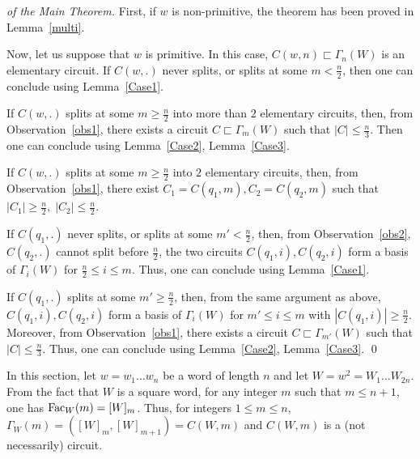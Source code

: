 \documentclass[runningheads,envcountsame,a4paper]{llncs}
\newcommand{\fac}{\hbox{\rm Fac}}
\begin{document}
\begin{proof}[of the Main Theorem]
First, if $w$ is non-primitive, the theorem has been proved in Lemma~\ref{multi}. 

Now, let us suppose that $w$ is primitive. In this case, $C(w,n) \sqsubset \Gamma_n(W)$ is an elementary circuit. If $C(w,.)$ never splits, or splits at some $m < \frac{n}{2}$, then one can conclude using Lemma~\ref{Case1}. 

If $C(w,.)$ splits at some $m \geq \frac{n}{2}$ into more than $2$ elementary circuits, then, from Observation~\ref{obs1}, there exists a circuit $C \sqsubset \Gamma_m(W)$ such that $|C|\leq \frac{n}{3}$. Then one can conclude using Lemma~\ref{Case2}, Lemma~\ref{Case3}. 

If $C(w,.)$ splits at some $m \geq \frac{n}{2}$ into $2$ elementary circuits, then, from Observation~\ref{obs1}, there exist $C_1=C(q_1,m),C_2=C(q_2,m)$ such that $|C_1|\geq \frac{n}{2}, \;|C_2|\leq \frac{n}{2}$. 

If $C(q_1,.)$ never splits, or splits at some $m' < \frac{n}{2}$, then, from Observation~\ref{obs2}, $C(q_2,.)$ cannot split before $\frac{n}{2}$, the two circuits $C(q_1,i),C(q_2,i)$ form a basis of $\Gamma_i(W)$ for $\frac{n}{2}\leq i \leq m$. Thus, one can conclude using Lemma~\ref{Case1}. 

If $C(q_1,.)$ splits at some $m' \geq \frac{n}{2}$, then, from the same argument as above, $C(q_1,i),C(q_2,i)$ form a basis of $\Gamma_i(W)$ for $m'\leq i \leq m$ with $|C(q_1,i)|\geq \frac{n}{2}$. Moreover, from Observation~\ref{obs1}, there exists a circuit $C \sqsubset \Gamma_{m'}(W)$ such that $|C|\leq \frac{n}{3}$. Thus, one can conclude using Lemma~\ref{Case2}, Lemma~\ref{Case3}. \qed

    
\end{proof}



















\iffalse

In this section, let $w=w_1\ldots w_n$ be a word of length $n$ and let $W=w^2=W_1\ldots W_{2n}$. From the fact that $W$ is a square word, for any integer $m$ such that $m\le n+1$, one has $\fac_W(m)=[W]_m$. Thus, for integers $1\leq  m\le n$, $\Gamma_W(m)=([W]_m, [W]_{m+1})=C(W,m)$ and $C(W,m)$ is a (not necessarily) circuit. 
\end{document}
